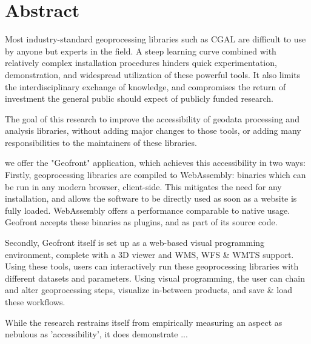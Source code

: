 
\chapter*{Abstract}

Most industry-standard geoprocessing libraries such as CGAL are difficult to use by anyone but experts in the field. A steep learning curve combined with relatively complex installation procedures hinders quick experimentation, demonstration, and widespread utilization of these powerful tools. It also limits the interdisciplinary exchange of knowledge, and compromises the return of investment the general public should expect of publicly funded research.



The goal of this research to improve the accessibility of geodata processing and analysis libraries, without adding major changes to those tools, or adding many responsibilities to the maintainers of these libraries. 

we offer the "Geofront" application, which achieves this accessibility in two ways: 
Firstly, geoprocessing libraries are compiled to WebAssembly: binaries which can be run in any modern browser, client-side. This mitigates the need for any installation, and allows the software to be directly used as soon as a website is fully loaded. WebAssembly offers a performance comparable to native usage. Geofront accepts these binaries as plugins, and as part of its source code. 

Secondly, Geofront itself is set up as a web-based visual programming environment, complete with a 3D viewer and WMS, WFS \& WMTS support. Using these tools, users can interactively run these geoprocessing libraries with different datasets and parameters. Using visual programming, the user can chain and alter geoprocessing steps, visualize in-between products, and save & load these workflows.

While the research restrains itself from empirically measuring an aspect as nebulous as 'accessibility', it does demonstrate ...


